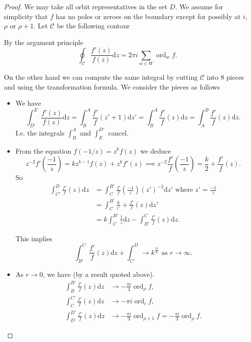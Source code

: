 \documentclass{article}
\theoremstyle{definition}
\DeclareMathOperator{\ord}{ord}
\begin{document}
\begin{proof}
We may take all orbit representatives in the set $D$.
We assume for simplicity that $f$ has no poles or zeroes on the boundary except for possibly at $i$, $\rho$ or $\rho + 1$.
Let $\mathcal{C}$ be the following contour

By the argument principle
\[\oint_{\mathcal{C}}\frac{f'(z)}{f(z)}\mathrm{d}z = 2\pi i \sum_{w\in W}\ord_w f.\]

On  the other hand we can compute the same integral by cutting $\mathcal{C}$ into 8 pieces and using the transformation formula.
We consider the pieces as follows
\begin{itemize}
\item We have
\[\int_{D'}^{E}\frac{f'(z)}{f(z)}\mathrm{d}z = \int_{B}^A \frac{f'}{f}(z' + 1)\mathrm{d}z' = \int_B^A \frac{f'}{f}(z)\mathrm{d}z = \int_A^B \frac{f'}{f}(z)\mathrm{d}z.\]
I.e. the integrals $\int_B^A$ and $\int_E^{D'}$ cancel.
\item From the equation $f(-1/z) = z^kf(z)$ we deduce
\[z^{-2}f'\left(\frac{-1}{z}\right) = kz^{k-1}f(z) + z^k f'(z) \implies z^{-2}\frac{f'}{f}\left(\frac{-1}{z}\right) = \frac{k}{2} + \frac{f'}{f}(z).\]
So
\begin{align*}
\int_{C'}^D \frac{f'}{f}(z)\mathrm{d}z &= \int_C^{B'}\frac{f'}{f}\left(\frac{-1}{z}\right)(z')^{-2}\mathrm{d} z' \text{ where } z' = \frac{-1}{z} \\
&=\int_C^{B'} \frac{k}{z'} + \frac{f'}{f}(z)\mathrm{d}z' \\
&=k\int_C^{B'}\frac{1}{z}\mathrm{d}z - \int_{B'}^C \frac{f'}{f}(z)\mathrm{d}z.
\end{align*}

This implies 
\[\int_{B'}^C\frac{f'}{f}(z)\mathrm{d}z + \int_{C'}^D \to k^{\frac{\pi i}{6}} \text{ as } r\to \infty.\]

\item As $r\to 0$, we have (by a result quoted above).
\begin{align*}
\int_B^{B'} \frac{f'}{f}(z)\mathrm{d}z &\to -\frac{\pi i}{3}\ord_\rho f, \\
\int_C^{C'} \frac{f'}{f}(z)\mathrm{d}z &\to -\pi i\ord_i f, \\
\int_D^{D'} \frac{f'}{f}(z)\mathrm{d}z &\to -\frac{\pi i}{3}\ord_{\rho+1} f = -\frac{\pi i}{3}\ord_\rho f.
\end{align*}


\end{itemize}
\end{proof}
\end{document}
